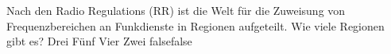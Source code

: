     {Nach den Radio Regulations (RR) ist die Welt für die Zuweisung von Frequenzbereichen an Funkdienste in Regionen aufgeteilt. Wie viele Regionen gibt es?}
    {Drei}
    {Fünf}
    {Vier}
    {Zwei}
    {false}{false}